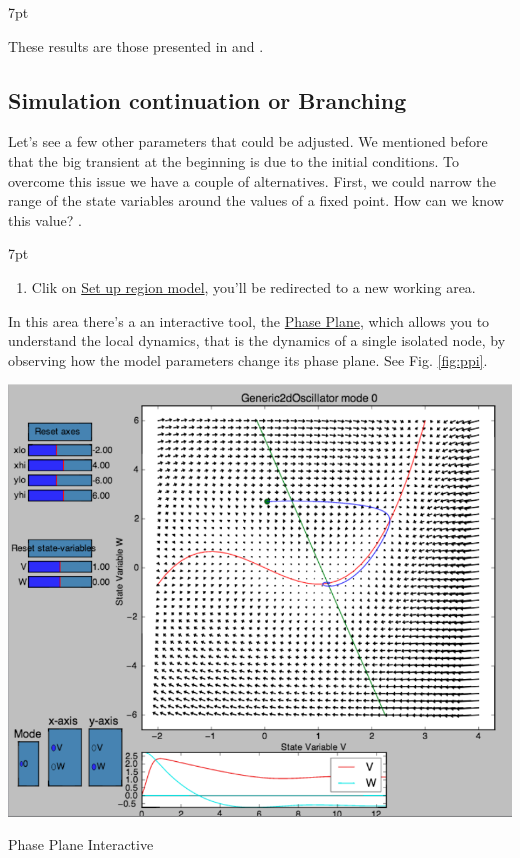\documentclass{tufte-handout}
\newenvironment{simulation}{%
  \def\FrameCommand{%
    \hspace{1pt}%
    {\color{ForestGreen}\vrule width 2pt}%
    {\color{simulationshade}\vrule width 4pt}%
    \colorbox{simulationshade}%
  }%
  \MakeFramed{\advance\hsize-\width\FrameRestore}%
  \noindent\hspace{-4.55pt}%
  \begin{adjustwidth}{}{7pt}%
  \vspace{2pt}\vspace{2pt}%
}
{%
  \vspace{2pt}\end{adjustwidth}\endMakeFramed%
}
\newenvironment{blah}{%
  \def\FrameCommand{%
    \hspace{1pt}%
    {\color{DarkOrange}\vrule width 2pt}%
    {\color{PeachPuff}\vrule width 4pt}%
    \colorbox{PeachPuff}%
  }%
  \MakeFramed{\advance\hsize-\width\FrameRestore}%
  \noindent\hspace{-4.55pt}%
  \begin{adjustwidth}{}{7pt}%
  \vspace{2pt}\vspace{2pt}%
}
{%
  \vspace{2pt}\end{adjustwidth}\endMakeFramed%
}
\begin{document}
\begin{blah}
 These results are those presented in \citep{Ghosh_2008} and \citep{Knock_2009}. 
\end{blah}

\subsection{Simulation continuation or Branching}\label{sec:results}

Let's see a few other parameters that could be adjusted. We mentioned before
that the big transient at the beginning is due to the initial conditions. To
overcome this issue we have a couple of alternatives. First, we could narrow the range of the state variables around the values of a fixed point. How can we know this value? .

\begin{simulation}
\begin{enumerate}
\item  Clik on \underline{Set up region model}, you'll be redirected to a new working area. 
\end{enumerate}
\end{simulation}


In this area there's a an interactive tool, the \underline{Phase Plane}, which allows you to understand the local dynamics, that is the dynamics of a single isolated node, by observing how the model parameters change its phase plane. See Fig. \ref{fig:ppi}.

\begin{marginfigure}%
  \includegraphics[width=\linewidth]{Handout_UI_BuildingYourOwnBrainNetworkModel_PhasePlane}%
  \caption{Phase Plane Interactive}%
  \label{fig:ppi}%
\end{marginfigure}%
\end{document}
